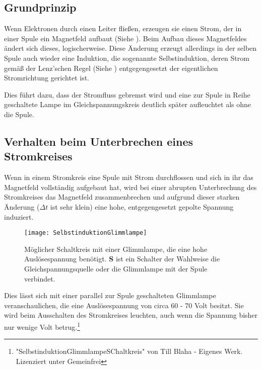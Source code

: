 \subsection{Grundprinzip}

Wenn Elektronen durch einen Leiter fließen, erzeugen sie einen Strom, der in einer Spule ein Magnetfeld aufbaut (Siehe ). Beim Aufbau dieses Magnetfeldes ändert sich dieses, logischerweise. Diese Änderung erzeugt allerdings in der selben Spule auch wieder eine Induktion, die sogenannte Selbstinduktion, deren Strom gemäß der Lenz'schen Regel (Siehe ) entgegengesetzt der eigentlichen Stromrichtung gerichtet ist.

Dies führt dazu, dass der Stromfluss \glqq gebremst\grqq{} wird und eine zur Spule in Reihe geschaltete Lampe im Gleichspannungskreis deutlich später aufleuchtet als ohne die Spule.

\subsection{Verhalten beim Unterbrechen eines Stromkreises}

Wenn in einem Stromkreis eine Spule mit Strom durchflossen und sich in ihr das Magnetfeld vollständig aufgebaut hat, wird bei einer abrupten Unterbrechung des Stromkreises das Magnetfeld zusammenbrechen und aufgrund dieser starken Änderung ($\Delta t$ ist sehr klein) eine hohe, entgegengesetzt gepolte Spannung induziert.

\begin{figure}
	\texttt{[image: SelbstinduktionGlimmlampe]}
	\caption{Möglicher Schaltkreis mit einer Glimmlampe, die eine hohe Auslösespannung benötigt. \textbf{S} ist ein Schalter der Wahlweise die Gleichspannungsquelle oder die Glimmlampe mit der Spule verbindet.}
	\label{fig:SchaltkreisGlimmlampe}
\end{figure}

Dies lässt sich mit einer parallel zur Spule geschalteten Glimmlampe veranschaulichen, die eine Auslösespannung von circa 60 - 70 Volt besitzt. Sie wird beim Ausschalten des Stromkreises leuchten, auch wenn die Spannung bisher nur wenige Volt betrug.\footnote{"SelbstinduktionGlimmlampeSChaltkreis" von Till Blaha - Eigenes Werk. Lizenziert unter Gemeinfrei}